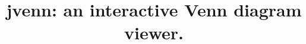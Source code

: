 \documentclass{bmcart}
\begin{document}
\begin{frontmatter}

\begin{fmbox}


\title{jvenn: an interactive Venn diagram viewer.}


\author[
   addressref={aff2},                   %
   noteref={n1},                        %
   email={Philippe.Bardou@toulouse.inra.fr}   %
]{ }
\author[
   addressref={aff1},
   corref={aff1},                       %
   noteref={n1},                        %
   email={Jerome.Mariette@toulouse.inra.fr}
]{ }
\author[
   addressref={aff1},
   email={Frederic.Escudie@toulouse.inra.fr}
]{ }
\author[
   addressref={aff1},
   email={Christophe.Djemiel@toulouse.inra.fr}
]{ }
\author[
   addressref={aff1,aff2},
   email={Christophe.Klopp@toulouse.inra.fr}
]{ }



\end{fmbox}
\end{frontmatter}
\end{document}
